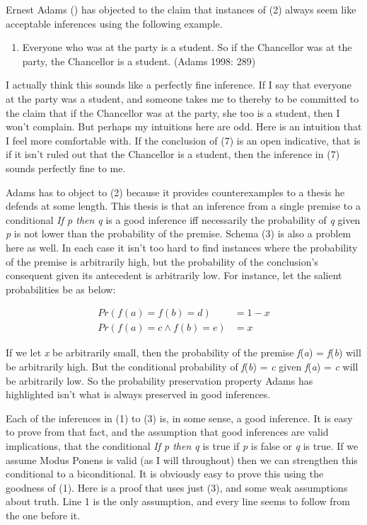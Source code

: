 \documentclass[
  11pt,
  letterpaper,
  DIV=11,
  numbers=noendperiod,
  oneside]{scrartcl}
\providecommand{\tightlist}{%
  \setlength{\itemsep}{0pt}\setlength{\parskip}{0pt}}\usepackage{longtable,booktabs,array}
\begin{document}
Ernest Adams () has objected to the claim
that instances of (2) always seem like acceptable inferences using the
following example.

\begin{enumerate}
\def\labelenumi{\arabic{enumi}.}
\setcounter{enumi}{6}
\tightlist
\item
  Everyone who was at the party is a student. So if the Chancellor was
  at the party, the Chancellor is a student. (Adams 1998: 289)
\end{enumerate}

I actually think this sounds like a perfectly fine inference. If I say
that everyone at the party was a student, and someone takes me to
thereby to be committed to the claim that if the Chancellor was at the
party, she too is a student, then I won't complain. But perhaps my
intuitions here are odd. Here is an intuition that I feel more
comfortable with. If the conclusion of (7) is an open indicative, that
is if it isn't ruled out that the Chancellor is a student, then the
inference in (7) sounds perfectly fine to me.

Adams has to object to (2) because it provides counterexamples to a
thesis he defends at some length. This thesis is that an inference from
a single premise to a conditional \emph{If p then q} is a good inference
iff necessarily the probability of \emph{q} given \emph{p} is not lower
than the probability of the premise. Schema (3) is also a problem here
as well. In each case it isn't too hard to find instances where the
probability of the premise is arbitrarily high, but the probability of
the conclusion's consequent given its antecedent is arbitrarily low. For
instance, let the salient probabilities be as below:

\[
\begin{aligned}
Pr(f(a) = f(b) = d) &= 1-x \\
Pr(f(a) = c \wedge f(b) = e) &= x
\end{aligned}
\]

If we let \emph{x} be arbitrarily small, then the probability of the
premise \emph{f}(\emph{a}) = \emph{f}(\emph{b}) will be arbitrarily
high. But the conditional probability of \emph{f}(\emph{b}) = \emph{c}
given \emph{f}(\emph{a}) = \emph{c} will be arbitrarily low. So the
probability preservation property Adams has highlighted isn't what is
always preserved in good inferences.

Each of the inferences in (1) to (3) is, in some sense, a good
inference. It is easy to prove from that fact, and the assumption that
good inferences are valid implications, that the conditional \emph{If p
then q} is true if \emph{p} is false or \emph{q} is true. If we assume
Modus Ponens is valid (as I will throughout) then we can strengthen this
conditional to a biconditional. It is obviously easy to prove this using
the goodness of (1). Here is a proof that uses just (3), and some weak
assumptions about truth. Line 1 is the only assumption, and every line
seems to follow from the one before it.
\end{document}
